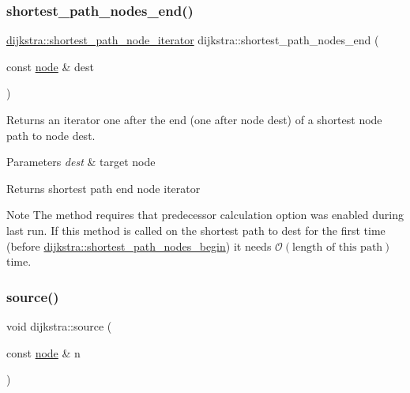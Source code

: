 \subsubsection{\texorpdfstring{shortest\+\_\+path\+\_\+nodes\+\_\+end()}{shortest\_path\_nodes\_end()}}
{\footnotesize\ttfamily \mbox{\hyperlink{classdijkstra_a5062e9a8339848666efcf2143c4c1881}{dijkstra\+::shortest\+\_\+path\+\_\+node\+\_\+iterator}} dijkstra\+::shortest\+\_\+path\+\_\+nodes\+\_\+end (\begin{DoxyParamCaption}\item[{const \mbox{\hyperlink{classnode}{node}} \&}]{dest }\end{DoxyParamCaption})}



Returns an iterator one after the end (one after node {\ttfamily dest}) of a shortest node path to node {\ttfamily dest}. 


\begin{DoxyParams}{Parameters}
{\em dest} & target node\\
\hline
\end{DoxyParams}
\begin{DoxyReturn}{Returns}
shortest path end node iterator
\end{DoxyReturn}
\begin{DoxyNote}{Note}
The method requires that predecessor calculation option was enabled during last run. If this method is called on the shortest path to {\ttfamily dest} for the first time (before \mbox{\hyperlink{classdijkstra_ae30c66319d925387ed858aab9ce419ae}{dijkstra\+::shortest\+\_\+path\+\_\+nodes\+\_\+begin}}) it needs $\mathcal{O}(\mbox{length of this path})$ time. 
\end{DoxyNote}
\mbox{\label{classdijkstra_a9689f2628f76ddb3747ea18c91bd7041}} 
\subsubsection{\texorpdfstring{source()}{source()}\hspace{0.1cm}{\footnotesize\ttfamily [1/2]}}
{\footnotesize\ttfamily void dijkstra\+::source (\begin{DoxyParamCaption}\item[{const \mbox{\hyperlink{classnode}{node}} \&}]{n }\end{DoxyParamCaption})}



